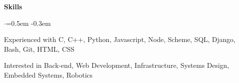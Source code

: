 \documentclass{resume} %
\begin{document}

\begin{rSection}{\textbf{Skills}}
  \vspace {0.3em}
  \begin{list}{$\cdot$}{\leftmargin=0.5em}
    \itemsep -0.3em \vspace{-0.3em}
    \item Experienced with C, C++, Python, Javascript, Node, Scheme, SQL, Django, Bash, Git, HTML, CSS
    \item Interested in Back-end, Web Development, Infrastructure, Systems Design, Embedded Systems, Robotics
  \end{list}
  \vspace{0.3em}
\end{rSection}

\end{document}
